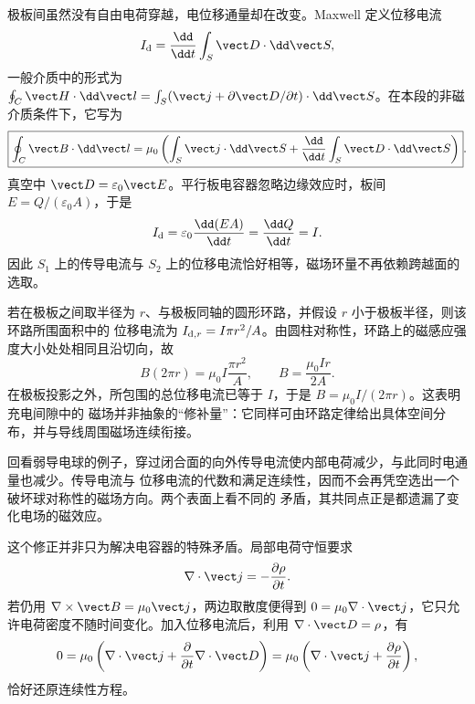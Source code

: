 极板间虽然没有自由电荷穿越，电位移通量却在改变。Maxwell 定义位移电流
\begin{equation}
  I_{\rm d}=\frac{\dd}{\dd t}\int_S\vect D\cdot\dd\vect S,
\end{equation}
一般介质中的形式为 $\oint_C\vect H\cdot\dd\vect l=\int_S(\vect j+\partial\vect D/\partial t)\cdot\dd\vect S$。在本段的非磁介质条件下，它写为
\begin{equation}
  \boxed{\oint_C\vect B\cdot\dd\vect l
  =\mu_0\left(\int_S\vect j\cdot\dd\vect S
  +\frac{\dd}{\dd t}\int_S\vect D\cdot\dd\vect S\right)}.
\end{equation}
真空中 $\vect D=\varepsilon_0\vect E$。平行板电容器忽略边缘效应时，板间
$E=Q/(\varepsilon_0 A)$，于是
\begin{equation}
  I_{\rm d}=\varepsilon_0\frac{\dd(EA)}{\dd t}
  =\frac{\dd Q}{\dd t}=I.
\end{equation}
因此 $S_1$ 上的传导电流与 $S_2$ 上的位移电流恰好相等，磁场环量不再依赖跨越面的选取。

若在极板之间取半径为 $r$、与极板同轴的圆形环路，并假设 $r$ 小于极板半径，则该环路所围面积中的
位移电流为 $I_{{\rm d},r}=I\pi r^2/A$。由圆柱对称性，环路上的磁感应强度大小处处相同且沿切向，故
\begin{equation}
  B(2\pi r)=\mu_0I\frac{\pi r^2}{A},
  \qquad B=\frac{\mu_0Ir}{2A}.
\end{equation}
在极板投影之外，所包围的总位移电流已等于 $I$，于是 $B=\mu_0I/(2\pi r)$。这表明充电间隙中的
磁场并非抽象的“修补量”：它同样可由环路定律给出具体空间分布，并与导线周围磁场连续衔接。

回看弱导电球的例子，穿过闭合面的向外传导电流使内部电荷减少，与此同时电通量也减少。传导电流与
位移电流的代数和满足连续性，因而不会再凭空选出一个破坏球对称性的磁场方向。两个表面上看不同的
矛盾，其共同点正是都遗漏了变化电场的磁效应。

这个修正并非只为解决电容器的特殊矛盾。局部电荷守恒要求
\begin{equation}
  \nabla\cdot\vect j=-\frac{\partial\rho}{\partial t}.
\end{equation}
若仍用 $\nabla\times\vect B=\mu_0\vect j$，两边取散度便得到
$0=\mu_0\nabla\cdot\vect j$，它只允许电荷密度不随时间变化。加入位移电流后，利用
$\nabla\cdot\vect D=\rho$，有
\begin{equation}
  0=\mu_0\left(\nabla\cdot\vect j+
  \frac{\partial}{\partial t}\nabla\cdot\vect D\right)
  =\mu_0\left(\nabla\cdot\vect j+\frac{\partial\rho}{\partial t}\right),
\end{equation}
恰好还原连续性方程。

